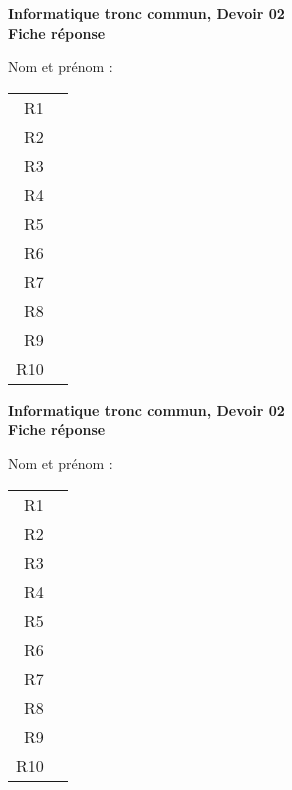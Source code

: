 \documentclass[francais,a4paper,div=19,12 pt]{scrartcl}
\begin{document}
\pagestyle{empty}
\newcommand{\rep}{\fbox{\phantom{\raisebox{0pt}[.5cm][.3cm]{}\makebox[9.5cm]{}}}}

\begin{center}
 \textbf{Informatique tronc commun, Devoir 02}\\
 \textbf{Fiche r\'eponse}
\end{center}
\medskip{}
 Nom  et pr\'enom : \hfill
 \bigskip{}
\centerline{}
\medskip{}
\begin{center}
\begin{tabular}{rc}
R1 & \rep \\[1 em]R2 & \rep \\[1 em]R3 & \rep \\[1 em]R4 & \rep \\[1 em]R5 & \rep \\[1 em]R6 & \rep \\[1 em]R7 & \rep \\[1 em]R8 & \rep \\[1 em]R9 & \rep \\[1 em]R10 & \rep \\[1 em]\end{tabular}
\end{center}\newpage

\begin{center}
 \textbf{Informatique tronc commun, Devoir 02}\\
 \textbf{Fiche r\'eponse}
\end{center}
\medskip{}
 Nom  et pr\'enom : \hfill
 \bigskip{}
\centerline{}
\medskip{}
\begin{center}
\begin{tabular}{rc}
R1 & \rep \\[1 em]R2 & \rep \\[1 em]R3 & \rep \\[1 em]R4 & \rep \\[1 em]R5 & \rep \\[1 em]R6 & \rep \\[1 em]R7 & \rep \\[1 em]R8 & \rep \\[1 em]R9 & \rep \\[1 em]R10 & \rep \\[1 em]\end{tabular}
\end{center}\newpage
\end{document}

